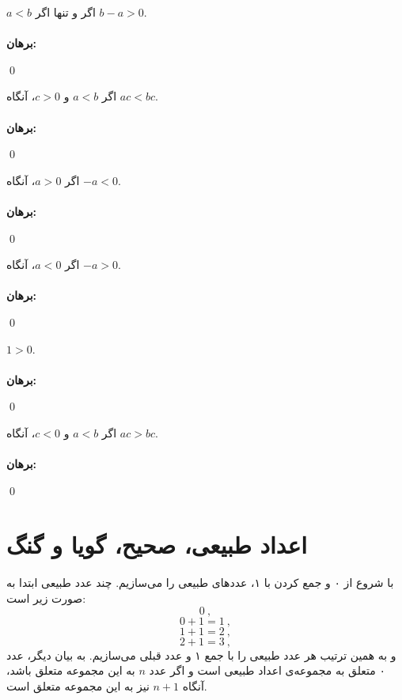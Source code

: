 \begin{theorem}
	$a<b$
	اگر و تنها اگر
	$b-a>0$.
	\\ \dfth \\ \textbf{برهان:}
	
	\qed
\end{theorem}

\begin{theorem}
	اگر
	$a<b$ و $c>0$،
	آنگاه
	$ac<bc$.
	\\ \dfth \\ \textbf{برهان:}
	
	\qed
\end{theorem}

\begin{theorem}
	اگر
	$a>0$،
	آنگاه
	$-a<0$.
	\\ \dfth \\ \textbf{برهان:}
	
	\qed
\end{theorem}

\begin{theorem}
	اگر
	$a<0$،
	آنگاه
	$-a>0$.
	\\ \dfth \\ \textbf{برهان:}
	
	\qed
\end{theorem}

\begin{theorem}
	$1>0$.
	\\ \dfth \\ \textbf{برهان:}
	
	\qed
\end{theorem}

\begin{theorem}
	اگر
	$a<b$ و $c<0$،
	آنگاه
	$ac>bc$.
	\\ \dfth \\ \textbf{برهان:}
	
	\qed
\end{theorem}

\section{اعداد طبیعی، صحیح، گویا و گنگ}
با شروع از ۰ و جمع کردن با ۱، عددهای طبیعی را می‌سازیم. چند عدد طبیعی ابتدا به صورت زیر است:
$$0 \ ,$$
$$0+1=1 \ ,$$
$$1+1=2 \ ,$$
$$2+1=3 \ ,$$
و به همین ترتیب هر عدد طبیعی را با جمع ۱ و عدد قبلی می‌سازیم. به بیان دیگر، عدد ۰ متعلق به مجموعه‌ی اعداد طبیعی است و اگر عدد $n$ به این مجموعه متعلق باشد، آنگاه
$n+1$
نیز به این مجموعه متعلق است.%

